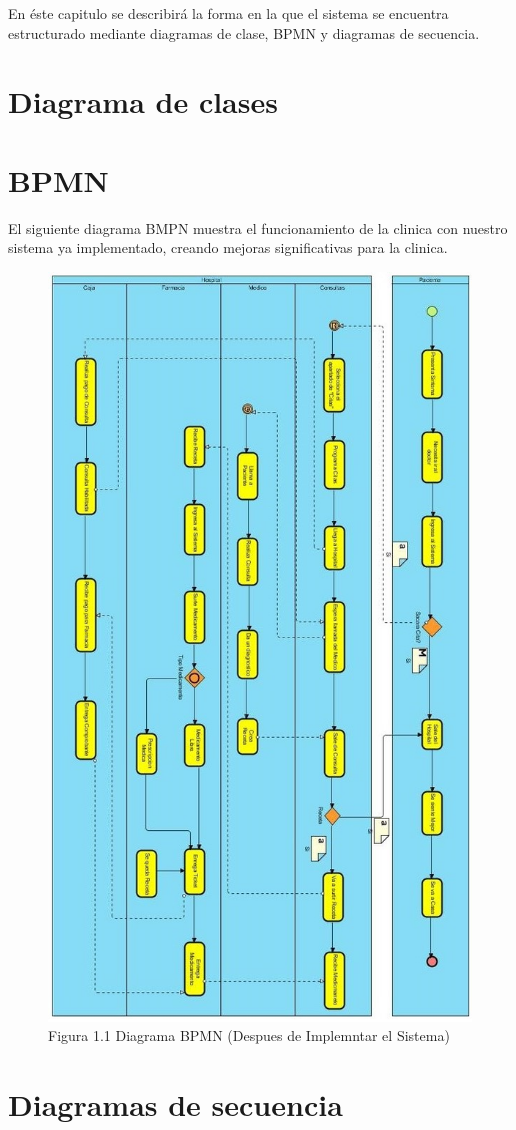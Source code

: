 

En \'este capitulo se describir\'a la forma en la que el sistema se encuentra estructurado mediante diagramas de clase, BPMN y diagramas de secuencia.
\section{Diagrama de clases}
\section{BPMN}
El siguiente diagrama BMPN muestra el funcionamiento de la clinica con nuestro sistema ya implementado, creando mejoras significativas para la clinica.
\begin{figure}[htbp!]
\centering
		\includegraphics[width=.7\textwidth]{images/diagramabpm}
		\caption{Figura 1.1 Diagrama BPMN (Despues de Implemntar el Sistema)}
	\end{figure}
	\newpage

\section{Diagramas de secuencia}

